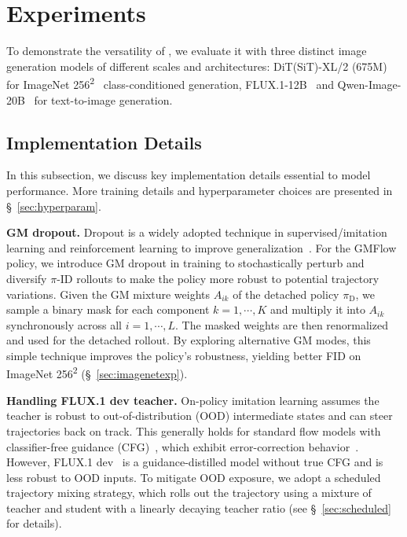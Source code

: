 \section{Experiments}
\label{sec:experiments}

To demonstrate the versatility of \methodname, we evaluate it with three distinct image generation models 
of different scales and architectures: DiT(SiT)-XL/2 (675M)~\citep{dit,sit,attention} for ImageNet 256\textsuperscript{2}~\citep{imagenet} class-conditioned generation, FLUX.1-12B~\citep{flux2024} and Qwen-Image-20B~\citep{qwen} for text-to-image generation. 


\subsection{Implementation Details}
In this subsection, we discuss key implementation details essential to model performance. More training details and hyperparameter choices are presented in \S~\ref{sec:hyperparam}.

\textbf{GM dropout.} 
Dropout is a widely adopted technique in supervised/imitation learning and reinforcement learning to improve generalization~\citep{dropout,cobbe2019}. 
For the GMFlow policy, we introduce GM dropout in training to stochastically perturb and diversify $\pi$-ID rollouts to make the policy more robust to potential trajectory variations. 
Given the GM mixture weights $A_{ik}$ of the detached policy $\pi_{\text{D}}$, we sample a binary mask for each component $k=1,\cdots,K$ and multiply it into $A_{ik}$ synchronously across all $i=1,\cdots,L$. The masked weights are then renormalized and used for the detached rollout. By exploring alternative GM modes, this simple technique improves the policy's robustness, yielding better FID on ImageNet 256\textsuperscript{2} (\S~\ref{sec:imagenetexp}).

\textbf{Handling FLUX.1 dev teacher.} On-policy imitation learning assumes the teacher is robust to out-of-distribution (OOD) intermediate states and can steer trajectories back on track. This generally holds for standard flow models with classifier-free guidance (CFG)~\citep{cfg}, which exhibit error-correction behavior~\citep{chidambaram2024what}. However, FLUX.1 dev~\citep{flux2024} is a guidance-distilled model without true CFG and is less robust to OOD inputs. To mitigate OOD exposure, we adopt a scheduled trajectory mixing strategy, which rolls out the trajectory using a mixture of teacher and student with a linearly decaying teacher ratio (see \S~\ref{sec:scheduled} for details).


